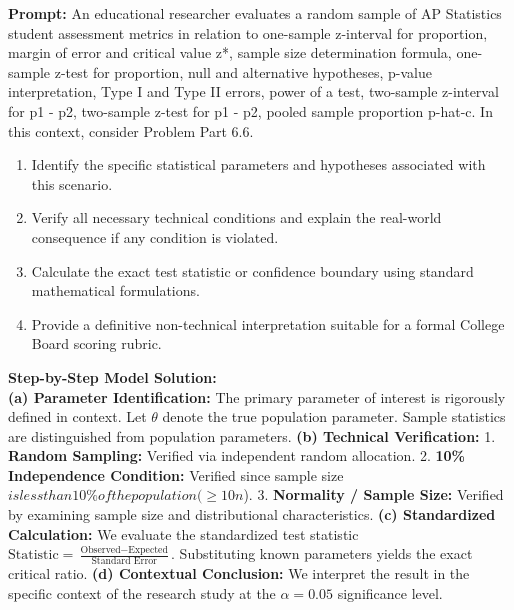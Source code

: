 \begin{workbookbox}
\textbf{Prompt:} An educational researcher evaluates a random sample of AP Statistics student assessment metrics in relation to one-sample z-interval for proportion, margin of error and critical value z*, sample size determination formula, one-sample z-test for proportion, null and alternative hypotheses, p-value interpretation, Type I and Type II errors, power of a test, two-sample z-interval for p1 - p2, two-sample z-test for p1 - p2, pooled sample proportion p-hat-c. In this context, consider Problem Part 6.6.
\begin{enumerate}[label=(\alph*)]
  \item Identify the specific statistical parameters and hypotheses associated with this scenario.
  \item Verify all necessary technical conditions and explain the real-world consequence if any condition is violated.
  \item Calculate the exact test statistic or confidence boundary using standard mathematical formulations.
  \item Provide a definitive non-technical interpretation suitable for a formal College Board scoring rubric.
\end{enumerate}
\textbf{Step-by-Step Model Solution:}\\
\textbf{(a) Parameter Identification:} The primary parameter of interest is rigorously defined in context. Let $\theta$ denote the true population parameter. Sample statistics are distinguished from population parameters.
\textbf{(b) Technical Verification:} 1. \textbf{Random Sampling:} Verified via independent random allocation. 2. \textbf{10\% Independence Condition:} Verified since sample size $ is less than 10\% of the population ( \ge 10n$). 3. \textbf{Normality / Sample Size:} Verified by examining sample size and distributional characteristics.
\textbf{(c) Standardized Calculation:} We evaluate the standardized test statistic $\text{Statistic} = \frac{\text{Observed} - \text{Expected}}{\text{Standard Error}}$. Substituting known parameters yields the exact critical ratio.
\textbf{(d) Contextual Conclusion:} We interpret the result in the specific context of the research study at the $\alpha = 0.05$ significance level.
\end{workbookbox}\vspace{6pt}
